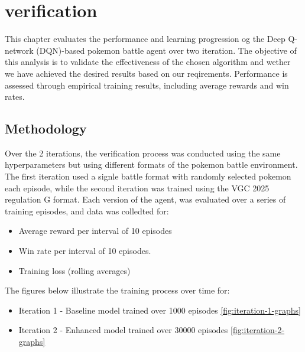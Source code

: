 \section{verification}
\label{sec:verification}

This chapter evaluates the performance and learning progression og the Deep Q-network 
(DQN)-based pokemon battle agent over two iteration. The objective of this analysis 
is to validate the effectiveness of the chosen algorithm and wether we have achieved
the desired results based on our reqirements. Performance is assessed through empirical
training results, including average rewards and win rates.  

\subsection{Methodology}
Over the 2 iterations, the verification process was conducted using the same hyperparameters
but using different formats of the pokemon battle environment.
The first iteration used a signle battle format with randomly selected pokemon each
episode, while the second iteration was trained using the VGC 2025 regulation G format.
Each version of the agent, was evaluated over a series of training episodes, and data 
was colledted for:
\begin{itemize}
    \item Average reward per interval of 10 episodes
    \item Win rate per interval of 10 episodes.
    \item Training loss (rolling averages)
\end{itemize}
The figures below illustrate the training process over time for:
\begin{itemize}
    \item Iteration 1 - Baseline model trained over 1000 episodes \ref{fig:iteration-1-graphs}
    \item Iteration 2 - Enhanced model trained over 30000 episodes \ref{fig:iteration-2-graphs} 
\end{itemize}


